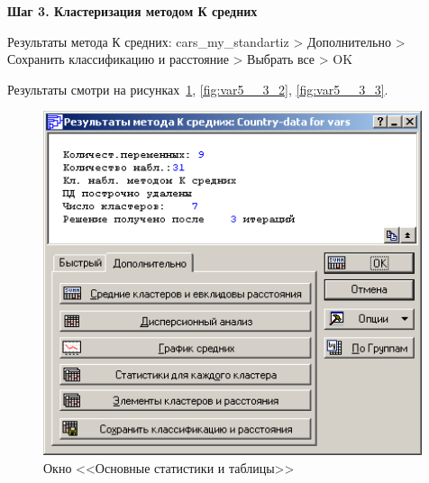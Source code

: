 \newpage

\begin{center}
  \textbf{Шаг 3. Кластеризация методом К средних}
\end{center}

Результаты метода К средних: cars\_my\_standartiz > Дополнительно > Сохранить классификацию и расстояние > Выбрать все > OK

Результаты смотри на рисунках~\ref{fig:var5__3_1}, \ref{fig:var5__3_2}, \ref{fig:var5__3_3}.

\begin{figure}[!h]
  \centering
  \begin{minipage}{0.49\textwidth}
    \centering

    \includegraphics[width=0.99\textwidth]
    {inc/cars_my/var5__3_1.PNG}

    \caption{Окно <<Основные статистики и таблицы>>}
    \label{fig:var5__3_1}
  \end{minipage}
  \begin{minipage}{0.49\textwidth}
    \centering


\end{minipage}
\end{figure}
